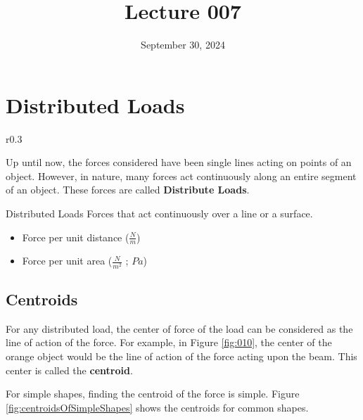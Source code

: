 \documentclass[12pt]{article}
\title{Lecture 007}
\date{September 30, 2024}
\begin{document}
\newpage
\section{Distributed Loads}
\label{sec:distributedLoads}

\begin{wrapfigure}[3]{r}{0.3\textwidth}
  \vspace{-30pt}
  \centering
  
  \caption{Continuous Load}
  \label{fig:010}
\end{wrapfigure}

Up until now, the forces considered have been single lines acting on points of an object.
However, in nature, many forces act continuously along an entire segment of an object. These
forces are called \textbf{Distribute Loads}.

\begin{definition}{Distributed Loads}
  Forces that act continuously over a line or a surface.
  \begin{itemize}
    \itemsep0em
    \item Force per unit distance ($\frac{N}{m}$)
    \item Force per unit area ($\frac{N}{m^2}$ ; $Pa$)
  \end{itemize}
\end{definition}

\subsection{Centroids}
\label{ssec:centroids}

For any distributed load, the center of force of the load can be considered as the line
of action of the force. For example, in Figure \ref{fig:010}, the center of the orange object
would be the line of action of the force acting upon the beam. This center is called the \textbf{centroid}.

For simple shapes, finding the centroid of the force is simple. Figure \ref{fig:centroidsOfSimpleShapes}
shows the centroids for common shapes.
\end{document}
